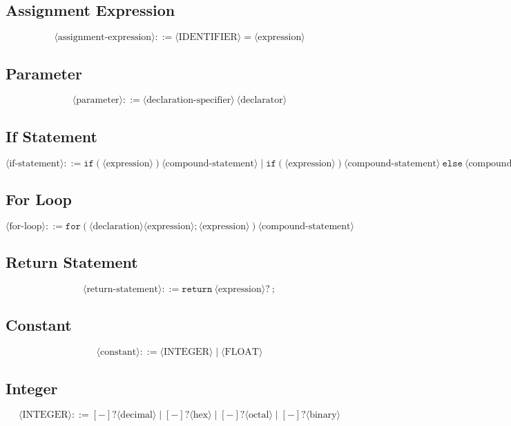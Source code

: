 \documentclass{article}
\begin{document}
\subsection{Assignment Expression}
\[
\langle \text{assignment-expression} \rangle ::= \langle \text{IDENTIFIER} \rangle = \langle \text{expression} \rangle
\]

\subsection{Parameter}
\[
\langle \text{parameter} \rangle ::= \langle \text{declaration-specifier} \rangle \ \langle \text{declarator} \rangle
\]

\subsection{If Statement}
\[
\langle \text{if-statement} \rangle ::= \texttt{if} ( \langle \text{expression} \rangle ) \langle \text{compound-statement} \rangle 
\mid \texttt{if} ( \langle \text{expression} \rangle ) \langle \text{compound-statement} \rangle \ \texttt{else} \ \langle \text{compound-statement} \rangle
\]

\subsection{For Loop}
\[
\langle \text{for-loop} \rangle ::= \texttt{for} ( \langle \text{declaration} \rangle \langle \text{expression} \rangle ; \langle \text{expression} \rangle ) \langle \text{compound-statement} \rangle
\]

\subsection{Return Statement}
\[
\langle \text{return-statement} \rangle ::= \texttt{return} \ \langle \text{expression} \rangle? \ ;
\]

\subsection{Constant}
\[
\langle \text{constant} \rangle ::= \langle \text{INTEGER} \rangle \mid \langle \text{FLOAT} \rangle
\]

\subsection{Integer}
\[
\langle \text{INTEGER} \rangle ::= [-]? \langle \text{decimal} \rangle 
\mid [-]? \langle \text{hex} \rangle 
\mid [-]? \langle \text{octal} \rangle 
\mid [-]? \langle \text{binary} \rangle
\]
\end{document}
